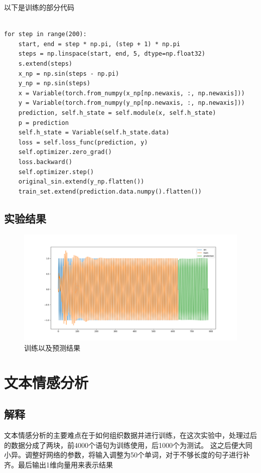 \documentclass[12pt, a4paper]{report}
\begin{document}
以下是训练的部分代码
\small
\begin{verbatim}

for step in range(200):
    start, end = step * np.pi, (step + 1) * np.pi
    steps = np.linspace(start, end, 5, dtype=np.float32)
    s.extend(steps)
    x_np = np.sin(steps - np.pi)
    y_np = np.sin(steps)
    x = Variable(torch.from_numpy(x_np[np.newaxis, :, np.newaxis]))
    y = Variable(torch.from_numpy(y_np[np.newaxis, :, np.newaxis]))
    prediction, self.h_state = self.module(x, self.h_state)
    p = prediction
    self.h_state = Variable(self.h_state.data)
    loss = self.loss_func(prediction, y)
    self.optimizer.zero_grad()
    loss.backward()
    self.optimizer.step()
    original_sin.extend(y_np.flatten())
    train_set.extend(prediction.data.numpy().flatten())

\end{verbatim}

\normalsize
\section{实验结果}

\begin{figure}[ht]
  \centering
  \includegraphics[scale=0.3]{Figure_1.png}
  \caption{训练以及预测结果}
  \label{}
\end{figure}

\chapter{文本情感分析}

\section{解释}

文本情感分析的主要难点在于如何组织数据并进行训练，在这次实验中，处理过后的数据分成了两块，前4000个语句为训练使用，后1000个为测试。
这之后便大同小异。调整好网络的参数，将输入调整为50个单词，对于不够长度的句子进行补齐。最后输出1维向量用来表示结果
\end{document}

